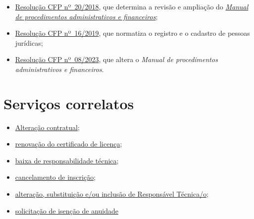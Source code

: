 \begin{itemize}
  \item  {\href{https://atosoficiais.com.br/cfp/resolucao-administrativa-financeira-n-20-2018-altera-o-manual-de-procedimentos-administrativo-e-financeiro-do-sistema-conselhos-de-psicologia-anexo-da-resolucao-cfp-n-202018-a-resolucao-cfp-n-03-2007-a-resolucao-cfp-n-16-2019-e-da-outras-providencias}{Resolução  CFP nº~20/2018}}, que determina a revisão e ampliação do  \href{https://transparencia.cfp.org.br/wp-content/uploads/sites/7/2020/05/Manual-de-Procedimentos-Administrativos-e-Financeiro-CFP-RES-20.2018.pdf}{\emph{Manual  de procedimentos administrativos e financeiros}};
  \item  \href{https://atosoficiais.com.br/cfp/resolucao-administrativa-financeira-n-16-2019-altera-o-manual-de-procedimentos-administrativo-e-financeiro-do-sistema-conselhos-de-psicologia-anexo-da-resolucao-cfp-n-202018-a-resolucao-cfp-n-03-2007-a-resolucao-cfp-n-16-2019-e-da-outras-providencias}{Resolução  CFP nº~16/2019}, que normatiza o registro e o cadastro de pessoas  jurídicas;
  \item  \href{https://atosoficiais.com.br/cfp/resolucao-administrativa-financeira-n-8-2023-altera-o-manual-de-procedimentos-administrativo-e-financeiro-do-sistema-conselhos-de-psicologia-anexo-da-resolucao-cfp-n-202018-a-resolucao-cfp-n-03-2007-a-resolucao-cfp-n-16-2019-e-da-outras-providencias?origin=instituicao}{Resolução  CFP nº~08/2023}, que altera o \emph{Manual de procedimentos  administrativos e financeiros}.
\end{itemize}

\section{Serviços correlatos}

\begin{itemize}
  \item  \hyperref[chap:pj-alteracao]{Alteração contratual};
  \item  \hyperref[chap:pj-licenca]{renovação do  certificado de licença};
  \item  \hyperref[chap:pj-baixa_rt]{baixa de  responsabilidade técnica};
  \item  \hyperref[chap:pj-cancelamento]{cancelamento de inscrição};
  \item  \hyperref[chap:pj-rt]{alteração, substituição e/ou inclusão de Responsável Técnica/o};
  \item  \hyperref[chap:pj-isencao]{solicitação  de isenção de anuidade}
\end{itemize}

\sumario